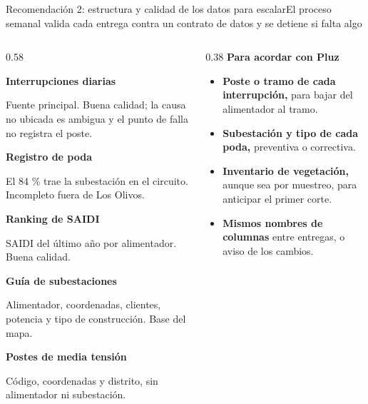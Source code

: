 \documentclass[aspectratio=169,10pt]{beamer}
\newcommand{\fila}[3]{\begin{tcolorbox}[colback=#3,colframe=#3,arc=1.5mm,top=0.5mm,bottom=0.5mm,left=2mm]
  {\footnotesize\bfseries #1}\par{\tiny\color{gris}#2}\end{tcolorbox}}
\begin{document}
\begin{frame}{Recomendación 2: estructura y calidad de los datos para escalar}{El proceso semanal valida cada entrega contra un contrato de datos y se detiene si falta algo}
  \begin{columns}[T]
    \begin{column}{0.58\textwidth}
      \fila{\color{azulos}Interrupciones diarias}{\scriptsize\color{negro}Fuente principal. Buena calidad; la causa no ubicada es ambigua y el punto de falla no registra el poste.}{azulcl}
      \fila{\color{azulos}Registro de poda}{\scriptsize\color{negro}El 84 \% trae la subestación en el circuito. Incompleto fuera de Los Olivos.}{azulcl}
      \fila{\color{azulos}Ranking de SAIDI}{\scriptsize\color{negro}SAIDI del último año por alimentador. Buena calidad.}{azulcl}
      \fila{\color{azulos}Guía de subestaciones}{\scriptsize\color{negro}Alimentador, coordenadas, clientes, potencia y tipo de construcción. Base del mapa.}{azulcl}
      \fila{\color{azulos}Postes de media tensión}{\scriptsize\color{negro}Código, coordenadas y distrito, sin alimentador ni subestación.}{azulcl}
    \end{column}
    \begin{column}{0.38\textwidth}\small
      {\bfseries\color{azul}Para acordar con Pluz}
      \begin{itemize}
        \item \textbf{Poste o tramo de cada interrupción,} para bajar del alimentador al tramo.
        \item \textbf{Subestación y tipo de cada poda,} preventiva o correctiva.
        \item \textbf{Inventario de vegetación,} aunque sea por muestreo, para anticipar el primer corte.
        \item \textbf{Mismos nombres de columnas} entre entregas, o aviso de los cambios.
      \end{itemize}
    \end{column}
  \end{columns}
\end{frame}
\end{document}
